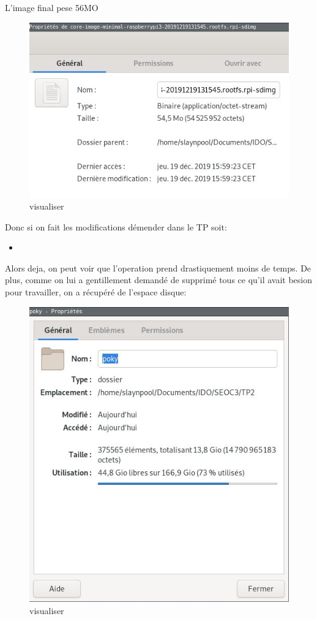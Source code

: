 \documentclass[10pt,a4paper]{article}
\newcommand{\insertcode}[2]{\begin{itemize}\item[]\end{itemize}}
\begin{document}
L'image final pese 56MO 
   \begin{figure}[h!]
\centering
\includegraphics[scale=0.50]{screen/2.jpg}
\caption{visualiser}
\label{fig:qos}
\end{figure}
Donc si on fait les modifications démender dans le TP soit:

\insertcode{commande/5.txt}{.}

Alors deja, on peut voir que l'operation prend drastiquement moins de temps.
De plus, comme on lui a gentillement demandé de supprimé tous ce qu'il avait besion pour travailler, on a récupéré de l'espace disque:

   \begin{figure}[h!]
\centering
\includegraphics[scale=0.50]{screen/3.jpg}
\caption{visualiser}
\label{fig:qos}
\end{figure}
\end{document}
